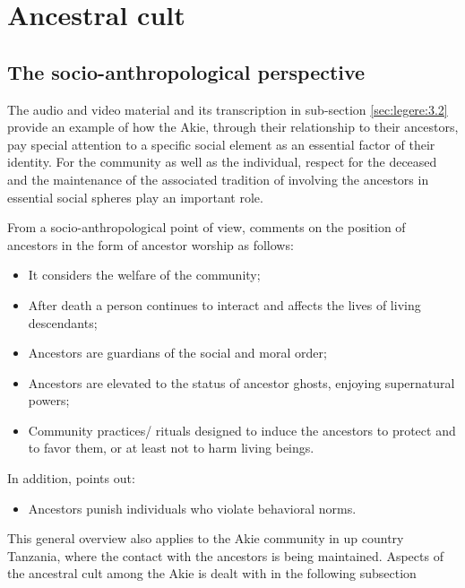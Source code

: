 \documentclass[output=paper,colorlinks,citecolor=brown]{langscibook}
\begin{document}
\section{Ancestral cult}\label{sec:legere:3}

\subsection{The socio-anthropological perspective}\label{sec:legere:3.1}

The audio and video material and its transcription in sub-section \ref{sec:legere:3.2} provide an example of how the Akie, through their relationship to their ancestors, pay special attention to a specific social element as an essential factor of their identity. For the community as well as the individual, respect for the deceased and the maintenance of the associated tradition of involving the ancestors in essential social spheres play an important role. 

From a socio-anthropological point of view, \cite[364]{Ferraro2005} comments on the position of ancestors in the form of ancestor worship as follows:

\begin{itemize}
    \item It considers the welfare of the community;
    \item After death a person continues to interact and affects the lives of living descendants;
    \item Ancestors are guardians of the social and moral order;
    \item Ancestors are elevated to the status of ancestor ghosts, enjoying supernatural powers;
    \item Community practices/ rituals designed to induce the ancestors to protect and to favor them, or at least not to harm living beings.
\end{itemize}

\noindent In addition, \cite[365]{Ferraro2005} points out: 

\begin{itemize}
    \item Ancestors punish individuals who violate behavioral norms.
\end{itemize}

\noindent This general overview also applies to the Akie community in up country Tanzania, where the contact with the ancestors is being maintained. Aspects of the ancestral cult among the Akie is dealt with in the following subsection
\end{document}
